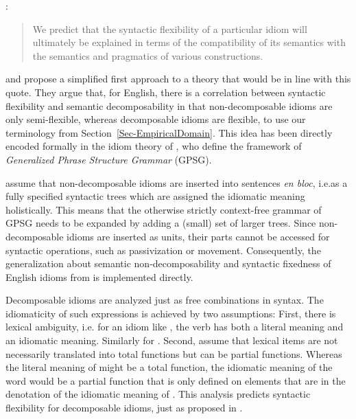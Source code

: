 \documentclass[output=paper]{langsci/langscibook}
\begin{document}
\ea \label{NSW-quote} \citet[]{NSW94a}:
\begin{quotation}
We predict that the syntactic flexibility of a particular idiom will ultimately be explained in terms of the compatibility of its semantics with the semantics and pragmatics of various constructions.
\end{quotation}
\z 



\cite{WSN84a-u} and \cite{NSW94a} propose a simplified first approach to a theory that would be in line with this quote. They argue that, for English, there is a correlation between syntactic flexibility and semantic decomposability in that non-decomposable idioms are only semi-flexible, whereas decomposable idioms are flexible, to use our terminology from Section~\ref{Sec-EmpiricalDomain}. 
This idea has been directly encoded formally in the idiom theory of
\cite{GKPS85a}, who define the framework of 
\emph{Generalized Phrase Structure Grammar} (GPSG).

\cite{GKPS85a} assume that  non-decomposable idioms are inserted into sentences \emph{en bloc}, i.e.\@ as a fully specified syntactic trees which are assigned the idiomatic meaning holistically. This means that the otherwise strictly context-free grammar of GPSG needs to be expanded by adding a (small) set of larger trees. 
Since non-decomposable idioms are inserted as units, their parts cannot be accessed for syntactic operations, such as passivization or movement. Consequently, the generalization about semantic non-decomposability and syntactic fixedness of English idioms from \cite{WSN84a-u} is implemented directly.

Decomposable idioms are analyzed just as free combinations in syntax. The idiomaticity of such expressions is achieved by two assumptions: First, there is lexical ambiguity, i.e. for an idiom like , the verb  has both a literal meaning and an idiomatic meaning. Similarly for .
Second, \cite{GKPS85a} assume that lexical items are not necessarily translated into total functions but can be partial functions. Whereas the literal meaning of  might be a total function, the idiomatic meaning of the word would be a partial function that is only defined on elements that are in the denotation of the idiomatic meaning of . This analysis predicts syntactic flexibility for decomposable idioms, just as proposed in \cite{WSN84a-u}.
\end{document}
